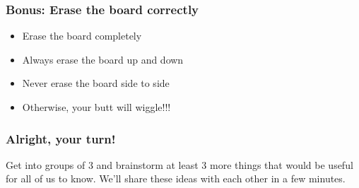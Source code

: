 \documentclass{beamer}
\begin{document}
\begin{frame}
\frametitle{Bonus: Erase the board correctly}
\begin{itemize}
	\pause 
  \item Erase the board completely
  	\pause 
  \item Always erase the board up and down
      	\pause 
  \item Never erase the board side to side
  	\pause
  \item Otherwise, your butt will wiggle!!!
\end{itemize}
\end{frame}

\begin{frame}
\frametitle{Alright, your turn!}
\pause
Get into groups of 3 and brainstorm at least 3 more things that would be useful for all of us to know.  We'll share these ideas with each other in a few minutes.
\end{frame}
\end{document}
